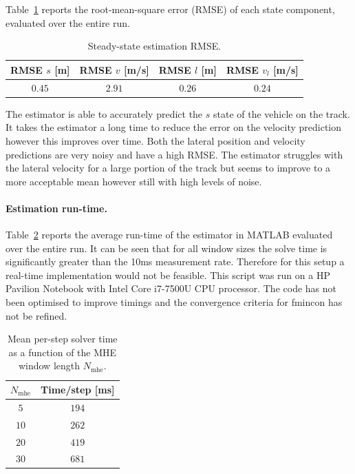 \documentclass{article}
\begin{document}
Table~\ref{tab:est_perf} reports the root-mean-square error (RMSE) of each state component, evaluated over the entire run.

\begin{table}[h]
    \centering
    \begin{tabular}{c|c|c|c}
        RMSE $s$ [m] & RMSE $v$ [m/s] & RMSE $l$ [m] & RMSE $v_{l}$ [m/s] \\ \hline
        $0.45$ & $2.91$ & $0.26$ & $0.24$ \\
    \end{tabular}
    \caption{Steady-state estimation RMSE.}
    \label{tab:est_perf}
\end{table}

The estimator is able to accurately predict the $s$ state of the vehicle on the track. It takes the estimator a long time to reduce the error on the velocity prediction however this improves over time. Both the lateral position and velocity predictions are very noisy and have a high RMSE. The estimator struggles with the lateral velocity for a large portion of the track but seems to improve to a more acceptable mean however still with high levels of noise. 

\paragraph{Estimation run-time.}
Table~\ref{tab:est_time} reports the average run-time of the estimator in MATLAB evaluated over the entire run. It can be seen that for all window sizes the solve time is significantly greater than the 10ms measurement rate. Therefore for this setup a real-time implementation would not be feasible. This script was run on a HP Pavilion Notebook with Intel Core i7-7500U CPU processor. The code has not been optimised to improve timings and the convergence criteria for fmincon has not be refined. 

\begin{table}[H]
    \centering
    \begin{tabular}{c|c}
        $N_{\text{mhe}}$ & Time/step [ms] \\ \hline
        $5$  & $194$   \\
        $10$ & $262$   \\
        $20$ & $419$  \\
        $30$ & $681$  \\
    \end{tabular}
    \caption{Mean per-step solver time as a function of the MHE window length $N_{\text{mhe}}$.}
    \label{tab:est_time}
\end{table}
\end{document}
